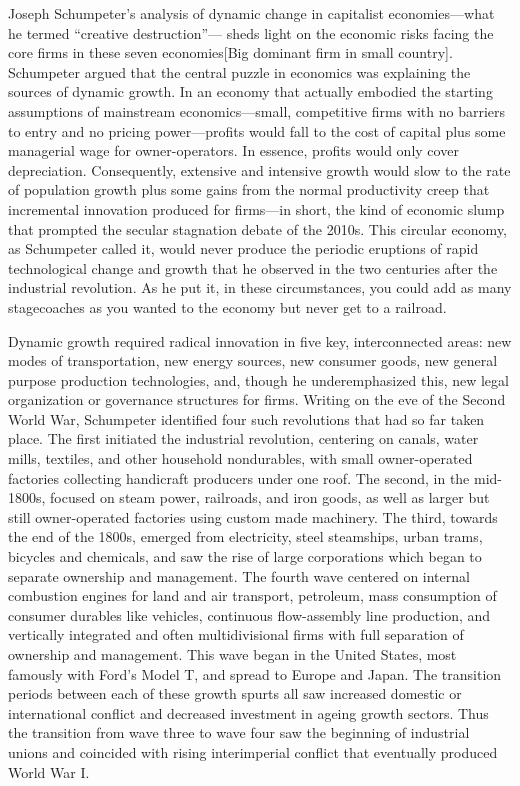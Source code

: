 \documentclass[
]{book}
\begin{document}
Joseph Schumpeter's analysis of dynamic change in capitalist economies---what he termed ``creative destruction''--- sheds light on the economic risks facing the core firms in these seven economies{[}Big dominant firm in small country{]}. Schumpeter argued that the central puzzle in economics was explaining the sources of dynamic growth. In an economy that actually embodied the starting assumptions of mainstream economics---small, competitive firms with no barriers to entry and no pricing power---profits would fall to the cost of capital plus some managerial wage for owner-operators. In essence, profits would only cover depreciation. Consequently, extensive and intensive growth would slow to the rate of population growth plus some gains from the normal productivity creep that incremental innovation produced for firms---in short, the kind of economic slump that prompted the secular stagnation debate of the 2010s. This circular economy, as Schumpeter called it, would never produce the periodic eruptions of rapid technological change and growth that he observed in the two centuries after the industrial revolution. As he put it, in these circumstances, you could add as many stagecoaches as you wanted to the economy but never get to a railroad.

Dynamic growth required radical innovation in five key, interconnected areas: new modes of transportation, new energy sources, new consumer goods, new general purpose production technologies, and, though he underemphasized this, new legal organization or governance structures for firms. Writing on the eve of the Second World War, Schumpeter identified four such revolutions that had so far taken place. The first initiated the industrial revolution, centering on canals, water mills, textiles, and other household nondurables, with small owner-operated factories collecting handicraft producers under one roof. The second, in the mid-1800s, focused on steam power, railroads, and iron goods, as well as larger but still owner-operated factories using custom made machinery. The third, towards the end of the 1800s, emerged from electricity, steel steamships, urban trams, bicycles and chemicals, and saw the rise of large corporations which began to separate ownership and management. The fourth wave centered on internal combustion engines for land and air transport, petroleum, mass consumption of consumer durables like vehicles, continuous flow-assembly line production, and vertically integrated and often multidivisional firms with full separation of ownership and management. This wave began in the United States, most famously with Ford's Model T, and spread to Europe and Japan. The transition periods between each of these growth spurts all saw increased domestic or international conflict and decreased investment in ageing growth sectors. Thus the transition from wave three to wave four saw the beginning of industrial unions and coincided with rising interimperial conflict that eventually produced World War I.
\end{document}
